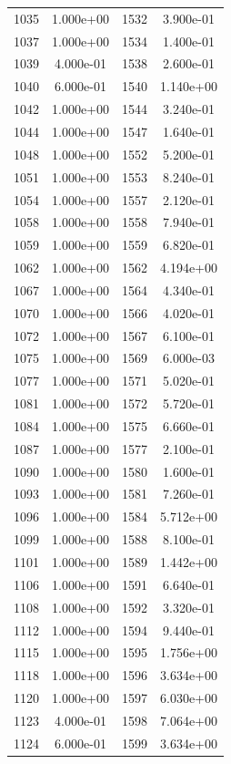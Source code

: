 \documentclass[12pt]{article}
\begin{document}
\begin{longtable}{@{}cccc@{}}
1035 & 1.000e+00 & 1532 & 3.900e-01 \\
1037 & 1.000e+00 & 1534 & 1.400e-01 \\
1039 & 4.000e-01 & 1538 & 2.600e-01 \\
1040 & 6.000e-01 & 1540 & 1.140e+00 \\
1042 & 1.000e+00 & 1544 & 3.240e-01 \\
1044 & 1.000e+00 & 1547 & 1.640e-01 \\
1048 & 1.000e+00 & 1552 & 5.200e-01 \\
1051 & 1.000e+00 & 1553 & 8.240e-01 \\
1054 & 1.000e+00 & 1557 & 2.120e-01 \\
1058 & 1.000e+00 & 1558 & 7.940e-01 \\
1059 & 1.000e+00 & 1559 & 6.820e-01 \\
1062 & 1.000e+00 & 1562 & 4.194e+00 \\
1067 & 1.000e+00 & 1564 & 4.340e-01 \\
1070 & 1.000e+00 & 1566 & 4.020e-01 \\
1072 & 1.000e+00 & 1567 & 6.100e-01 \\
1075 & 1.000e+00 & 1569 & 6.000e-03 \\
1077 & 1.000e+00 & 1571 & 5.020e-01 \\
1081 & 1.000e+00 & 1572 & 5.720e-01 \\
1084 & 1.000e+00 & 1575 & 6.660e-01 \\
1087 & 1.000e+00 & 1577 & 2.100e-01 \\
1090 & 1.000e+00 & 1580 & 1.600e-01 \\
1093 & 1.000e+00 & 1581 & 7.260e-01 \\
1096 & 1.000e+00 & 1584 & 5.712e+00 \\
1099 & 1.000e+00 & 1588 & 8.100e-01 \\
1101 & 1.000e+00 & 1589 & 1.442e+00 \\
1106 & 1.000e+00 & 1591 & 6.640e-01 \\
1108 & 1.000e+00 & 1592 & 3.320e-01 \\
1112 & 1.000e+00 & 1594 & 9.440e-01 \\
1115 & 1.000e+00 & 1595 & 1.756e+00 \\
1118 & 1.000e+00 & 1596 & 3.634e+00 \\
1120 & 1.000e+00 & 1597 & 6.030e+00 \\
1123 & 4.000e-01 & 1598 & 7.064e+00 \\
1124 & 6.000e-01 & 1599 & 3.634e+00 \\

\end{longtable}
\end{document}
